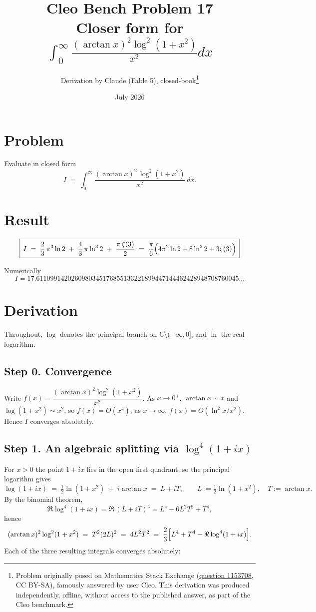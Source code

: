 \documentclass[11pt]{article}
\title{Cleo Bench Problem 17\\[1ex]\large Closer form for $\int_0^\infty\frac{(\arctan{x})^2\log^2({1+x^2})}{x^2}dx$}
\author{Derivation by Claude (Fable 5), closed-book\thanks{Problem originally
posed on Mathematics Stack Exchange
(\href{https://math.stackexchange.com/q/1153708}{question 1153708}, CC BY-SA),
famously answered by user Cleo. This derivation was produced independently,
offline, without access to the published answer, as part of the Cleo benchmark.}}
\date{July 2026}
\theoremstyle{remark}
\begin{document}
\maketitle

\section*{Problem}

Evaluate in closed form
\[
I \;=\; \int_0^\infty\frac{(\arctan x)^2\,\log^2(1+x^2)}{x^2}\,dx .
\]

\section*{Result}

\[
\boxed{\,I \;=\; \frac{2}{3}\,\pi^3\ln 2 \;+\; \frac{4}{3}\,\pi\ln^3 2 \;+\; \frac{\pi\,\zeta(3)}{2}
\;=\;\frac{\pi}{6}\Bigl(4\pi^2\ln 2+8\ln^3 2+3\zeta(3)\Bigr)\, }
\]

Numerically
\[
I = 17.6110991420260980345176855133221899447144462428948708760045\ldots
\]

\section*{Derivation}

Throughout, $\log$ denotes the principal branch on $\mathbb{C}\setminus(-\infty,0]$, and $\ln$ the real logarithm.

\subsection*{Step 0. Convergence}

Write $f(x)=\dfrac{(\arctan x)^2\log^2(1+x^2)}{x^2}$. As $x\to0^+$, $\arctan x\sim x$ and $\log(1+x^2)\sim x^2$, so $f(x)=O(x^4)$; as $x\to\infty$, $f(x)=O(\ln^2 x/x^2)$. Hence $I$ converges absolutely.

\subsection*{Step 1. An algebraic splitting via $\log^4(1+ix)$}

For $x>0$ the point $1+ix$ lies in the open first quadrant, so the principal logarithm gives
\[
\log(1+ix)\;=\;\tfrac12\ln(1+x^2)\;+\;i\arctan x\;=\;L+iT,
\qquad L:=\tfrac12\ln(1+x^2),\quad T:=\arctan x .
\]
By the binomial theorem,
\[
\Re\log^4(1+ix)=\Re\,(L+iT)^4=L^4-6L^2T^2+T^4 ,
\]
hence
\[
(\arctan x)^2\log^2(1+x^2)\;=\;T^2(2L)^2\;=\;4L^2T^2
\;=\;\frac{2}{3}\Bigl[L^4+T^4-\Re\log^4(1+ix)\Bigr].
\]
Each of the three resulting integrals converges absolutely:
\end{document}
